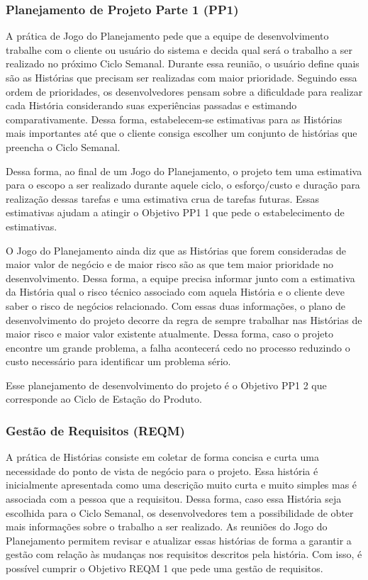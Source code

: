 \subsubsection{Planejamento de Projeto Parte 1 (PP1)}
\label{sec:+pp1}

A prática de Jogo do Planejamento pede que a equipe de desenvolvimento
trabalhe com o cliente ou usuário do sistema e decida qual será o
trabalho a ser realizado no próximo Ciclo Semanal. Durante essa
reunião, o usuário define quais são as Histórias que precisam ser
realizadas com maior prioridade. Seguindo essa ordem de prioridades,
os desenvolvedores pensam sobre a dificuldade para realizar cada
História considerando suas experiências passadas e estimando
comparativamente. Dessa forma, estabelecem-se estimativas para as
Histórias mais importantes até que o cliente consiga escolher um
conjunto de histórias que preencha o Ciclo Semanal.

Dessa forma, ao final de um Jogo do Planejamento, o projeto tem uma
estimativa para o escopo a ser realizado durante aquele ciclo, o
esforço/custo e duração para realização dessas tarefas e uma
estimativa crua de tarefas futuras. Essas estimativas ajudam a atingir
o Objetivo PP1 1 que pede o estabelecimento de estimativas.

O Jogo do Planejamento ainda diz que as Histórias que forem
consideradas de maior valor de negócio e de maior risco são as que tem
maior prioridade no desenvolvimento. Dessa forma, a equipe precisa
informar junto com a estimativa da História qual o risco técnico
associado com aquela História e o cliente deve saber o risco de
negócios relacionado. Com essas duas informações, o plano de
desenvolvimento do projeto decorre da regra de sempre trabalhar nas
Histórias de maior risco e maior valor existente atualmente. Dessa
forma, caso o projeto encontre um grande problema, a falha acontecerá
cedo no processo reduzindo o custo necessário para identificar um
problema sério.

Esse planejamento de desenvolvimento do projeto é o Objetivo PP1 2 que
corresponde ao Ciclo de Estação do Produto.

\subsubsection{Gestão de Requisitos (REQM)}
\label{sec:+reqm}

A prática de Histórias consiste em coletar de forma concisa e curta
uma necessidade do ponto de vista de negócio para o projeto. Essa
história é inicialmente apresentada como uma descrição muito curta e
muito simples mas é associada com a pessoa que a requisitou. Dessa
forma, caso essa História seja escolhida para o Ciclo Semanal, os
desenvolvedores tem a possibilidade de obter mais informações sobre o
trabalho a ser realizado. As reuniões do Jogo do Planejamento permitem
revisar e atualizar essas histórias de forma a garantir a gestão com
relação às mudanças nos requisitos descritos pela história. Com isso,
é possível cumprir o Objetivo REQM 1 que pede uma gestão de
requisitos.

